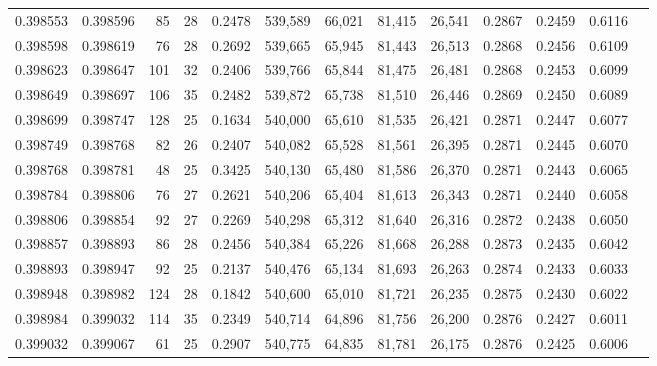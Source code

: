 \begin{tabular}{rrrrrrrrrrrrr}
0.398553 & 0.398596 &    85 &  28 &                                     0.2478 & 539,589 &  66,021 &  81,415 &  26,541 & 0.2867 & 0.2459 & 0.6116 \\
0.398598 & 0.398619 &    76 &  28 &                                     0.2692 & 539,665 &  65,945 &  81,443 &  26,513 & 0.2868 & 0.2456 & 0.6109 \\
0.398623 & 0.398647 &   101 &  32 &                                     0.2406 & 539,766 &  65,844 &  81,475 &  26,481 & 0.2868 & 0.2453 & 0.6099 \\
0.398649 & 0.398697 &   106 &  35 &                                     0.2482 & 539,872 &  65,738 &  81,510 &  26,446 & 0.2869 & 0.2450 & 0.6089 \\
0.398699 & 0.398747 &   128 &  25 &                                     0.1634 & 540,000 &  65,610 &  81,535 &  26,421 & 0.2871 & 0.2447 & 0.6077 \\
0.398749 & 0.398768 &    82 &  26 &                                     0.2407 & 540,082 &  65,528 &  81,561 &  26,395 & 0.2871 & 0.2445 & 0.6070 \\
0.398768 & 0.398781 &    48 &  25 &                                     0.3425 & 540,130 &  65,480 &  81,586 &  26,370 & 0.2871 & 0.2443 & 0.6065 \\
0.398784 & 0.398806 &    76 &  27 &                                     0.2621 & 540,206 &  65,404 &  81,613 &  26,343 & 0.2871 & 0.2440 & 0.6058 \\
0.398806 & 0.398854 &    92 &  27 &                                     0.2269 & 540,298 &  65,312 &  81,640 &  26,316 & 0.2872 & 0.2438 & 0.6050 \\
0.398857 & 0.398893 &    86 &  28 &                                     0.2456 & 540,384 &  65,226 &  81,668 &  26,288 & 0.2873 & 0.2435 & 0.6042 \\
0.398893 & 0.398947 &    92 &  25 &                                     0.2137 & 540,476 &  65,134 &  81,693 &  26,263 & 0.2874 & 0.2433 & 0.6033 \\
0.398948 & 0.398982 &   124 &  28 &                                     0.1842 & 540,600 &  65,010 &  81,721 &  26,235 & 0.2875 & 0.2430 & 0.6022 \\
0.398984 & 0.399032 &   114 &  35 &                                     0.2349 & 540,714 &  64,896 &  81,756 &  26,200 & 0.2876 & 0.2427 & 0.6011 \\
0.399032 & 0.399067 &    61 &  25 &                                     0.2907 & 540,775 &  64,835 &  81,781 &  26,175 & 0.2876 & 0.2425 & 0.6006 \\

\end{tabular}
